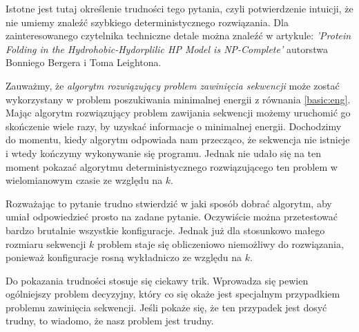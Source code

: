\documentclass[leqno,10pt]{article}
\begin{document}
Istotne jest tutaj określenie trudności tego pytania, czyli potwierdzenie intuicji, że nie umiemy znaleźć szybkiego deterministycznego rozwiązania. Dla zainteresowanego czytelnika techniczne detale można znaleźć w artykule: \textit{'Protein Folding in the Hydrohobic-Hydorplilic HP Model is NP-Complete'} autorstwa Bonniego Bergera i Toma Leightona. 


Zauważmy, że \textit{algorytm rozwiązujący problem zawinięcia sekwencji} może zostać wykorzystany w problem poszukiwania minimalnej energii z równania \ref{basic:eng}. Mając algorytm rozwiązujący problem zawijania sekwencji możemy uruchomić go skończenie wiele razy, by uzyskać informacje o minimalnej energii. Dochodzimy do momentu, kiedy algorytm odpowiada nam przecząco, że sekwencja nie istnieje i wtedy kończymy wykonywanie się programu. Jednak nie udało się na ten moment pokazać algorytmu deterministycznego rozwiązującego ten problem w wielomianowym czasie ze względu na $k$. 

Rozważając to pytanie trudno stwierdzić w jaki sposób dobrać algorytm, aby umiał odpowiedzieć prosto na zadane pytanie. Oczywiście można przetestować bardzo brutalnie wszystkie konfiguracje. Jednak już dla stosunkowo małego rozmiaru sekwencji $k$ problem staje się obliczeniowo niemożliwy do rozwiązania, ponieważ konfiguracje rosną wykładniczo ze względu na $k$.

Do pokazania trudności stosuje się ciekawy trik. Wprowadza się pewien ogólniejszy problem decyzyjny, który co się okaże jest specjalnym przypadkiem problemu zawinięcia sekwencji. Jeśli pokaże się, że ten przypadek jest dosyć trudny, to wiadomo, że nasz problem jest trudny.  
\end{document}
